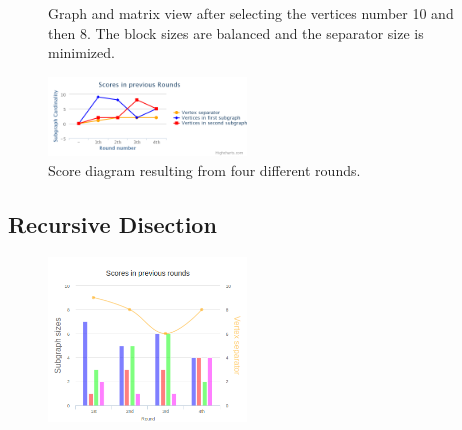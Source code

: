 \documentclass[12pt, oneside]{book}
\begin{document}
\begin{figure}
\centering
{}%
\caption{Graph and matrix view after selecting the vertices number 10 and then 8. The block sizes are balanced and the separator size is minimized.}
\label{selected810}
\end{figure}

\begin{figure}
\centering
\includegraphics[width=0.47\textwidth]{diagram}
\caption{Score diagram resulting from four different rounds.}
\label{diagram}
\end{figure}

\subsection{Recursive Disection}
\begin{figure}
\centering
\includegraphics[width=0.47\textwidth]{chart2}
\caption{}
\label{barchart}
\end{figure}
\end{document}
